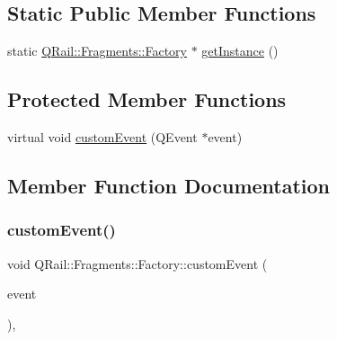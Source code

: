 \subsection*{Static Public Member Functions}
\begin{DoxyCompactItemize}
\item 
static \mbox{\hyperlink{classQRail_1_1Fragments_1_1Factory}{Q\+Rail\+::\+Fragments\+::\+Factory}} $\ast$ \mbox{\hyperlink{classQRail_1_1Fragments_1_1Factory_a26ad4dba8c552d6a9920c5a8cbbc2af9}{get\+Instance}} ()
\end{DoxyCompactItemize}
\subsection*{Protected Member Functions}
\begin{DoxyCompactItemize}
\item 
virtual void \mbox{\hyperlink{classQRail_1_1Fragments_1_1Factory_a251a17b7e9ff13102ecbaa96a42a660f}{custom\+Event}} (Q\+Event $\ast$event)
\end{DoxyCompactItemize}


\subsection{Member Function Documentation}
\mbox{\label{classQRail_1_1Fragments_1_1Factory_a251a17b7e9ff13102ecbaa96a42a660f}} 
\subsubsection{\texorpdfstring{customEvent()}{customEvent()}}
{\footnotesize\ttfamily void Q\+Rail\+::\+Fragments\+::\+Factory\+::custom\+Event (\begin{DoxyParamCaption}\item[{Q\+Event $\ast$}]{event }\end{DoxyParamCaption})\hspace{0.3cm}{\ttfamily [protected]}, {\ttfamily [virtual]}}

\mbox{\label{classQRail_1_1Fragments_1_1Factory_a32781d890e698f2daed981510c72287c}} 
